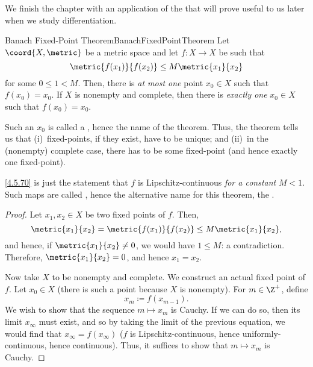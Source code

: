 We finish the chapter with an application of the  that will prove useful to us later when we study differentiation.
\begin{thm}{Banach Fixed-Point Theorem}{BanachFixedPointTheorem}
Let $\coord{X,\metric}$ be a metric space and let $f\colon X\rightarrow X$ be such that
\begin{equation}\label{4.5.70}
\metric{f(x_1)}{f(x_2)}\leq M\metric{x_1}{x_2}
\end{equation}
for some $0\leq 1<M$.  Then, there is \emph{at most one} point $x_0\in X$ such that $f(x_0)=x_0$.  If $X$ is nonempty and complete, then there is \emph{exactly one} $x_0\in X$ such that $f(x_0)=x_0$.
\begin{rmk}
Such an $x_0$ is called a , hence the name of the theorem.  Thus, the theorem tells us that (i)~fixed-points, if they exist, have to be unique; and (ii)~in the (nonempty) complete case, there has to be some fixed-point (and hence exactly one fixed-point).
\end{rmk}
\begin{rmk}
\eqref{4.5.70} is just the statement that $f$ is Lipschitz-continuous \emph{for a constant} $M<1$.  Such maps are called , hence the alternative name for this theorem, the .
\end{rmk}
\begin{proof}
Let $x_1,x_2\in X$ be two fixed points of $f$.  Then,
\begin{equation}
\metric{x_1}{x_2}=\metric{f(x_1)}{f(x_2)}\leq M\metric{x_1}{x_2},
\end{equation}
and hence, if $\metric{x_1}{x_2}\neq 0$, we would have $1\leq M$:  a contradiction.  Therefore, $\metric{x_1}{x_2}=0$, and hence $x_1=x_2$.

Now take $X$ to be nonempty and complete.  We construct an actual fixed point of $f$.  Let $x_0\in X$ (there is such a point because $X$ is nonempty).  For $m\in \Z ^+$, define
\begin{equation}
x_m\coloneqq f(x_{m-1}).
\end{equation}
We wish to show that the sequence $m\mapsto x_m$ is Cauchy.  If we can do so, then its limit $x_\infty$ must exist, and so by taking the limit of the previous equation, we would find that $x_\infty =f(x_\infty )$ ($f$ is Lipschitz-continuous, hence uniformly-continuous, hence continuous).  Thus, it suffices to show that $m\mapsto x_m$ is Cauchy.


\end{proof}
\end{thm}
